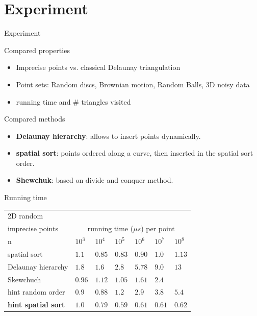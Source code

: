 \documentclass{beamer}
\begin{document}
\section{Experiment}
\frame{\tableofcontents[currentsection]}
\begin{frame}{Experiment}



\begin{block}{Compared properties}
\begin{itemize}
\item Imprecise points vs. classical Delaunay triangulation
\item Point sets: Random discs, Brownian motion, Random Balls, 3D noisy data
\item running time and \# triangles visited
\end{itemize}
\end{block}

\begin{block}{Compared methods}
\begin{itemize}
\item \textbf{Delaunay hierarchy}: allows to insert points dynamically.\\
\item \textbf{spatial sort}: points ordered along a curve, then inserted in the spatial sort order. \\
\item \textbf{Shewchuk}: based on divide and conquer method.\\
\end{itemize}

\end{block}
\end{frame}

\begin{frame}{Running time}
\begin{tabular}{|l||l|l|l|l|l|l|}
\hline
2D random \\
imprecise points & \multicolumn{6}{|c|}{running time  ($\mu s$) per point}\\
 \hline \hline
    n & $10^3$ & $10^4$ & $10^5$ & $10^6$ & $10^7$ & $10^8$\\\hline
    spatial sort & $1.1$ & $0.85 $ & $0.83 $ & $0.90 $ & $1.0 $ & $1.13$\\\hline
    Delaunay hierarchy & $1.8$ & $1.6$ & $2.8 $ & $5.78 $ & $9.0$ & $13$\\\hline
    Skewchuch & $0.96 $ & $1.12$ & $1.05 $ & $1.61 $ & $2.4$ &\\\hline
    hint random order & $0.9 $ & $0.88 $ & $1.2 $ & $2.9 $ & $3.8$ & $5.4$\\\hline
    \textbf{hint spatial sort} & $1.0 $ & $0.79$ & $0.59$ & $0.61 $ & $0.61 $ & $0.62$\\\hline
\end{tabular}
\end{frame}
\end{document}
